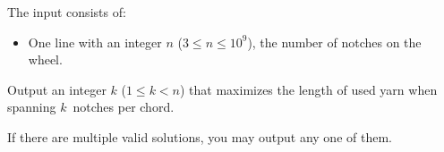 
\begin{Input}
The input consists of:
\begin{itemize}
    \item One line with an integer $n$ ($3\leq n\leq 10^9$), the number of notches on the wheel.
\end{itemize}
\end{Input}

\begin{Output}
    Output an integer $k$ ($1\leq k < n$) that maximizes the length of used yarn when spanning $k$~notches per chord.

    If there are multiple valid solutions, you may output any one of them.
\end{Output}
